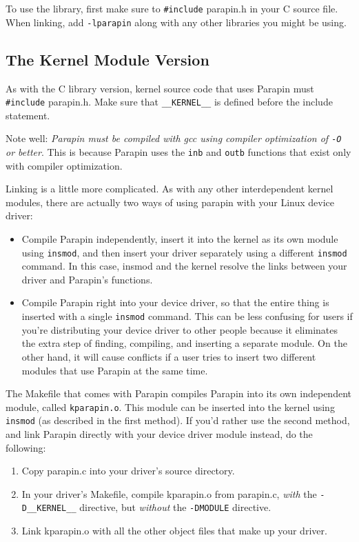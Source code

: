 \documentclass{article}
\begin{document}
To use the library, first make sure to {\tt \#include} parapin.h in
your C source file.  When linking, add {\tt -lparapin} along with any
other libraries you might be using.


\subsection{The Kernel Module Version}

As with the C library version, kernel source code that uses Parapin
must {\tt \#include} parapin.h.  Make sure that \verb|__KERNEL__| is
defined before the include statement.

Note well: {\em Parapin must be compiled with gcc using compiler
optimization of {\tt -O} or better}.  This is because Parapin uses the
{\tt inb} and {\tt outb} functions that exist only with compiler
optimization.

Linking is a little more complicated.  As with any other
interdependent kernel modules, there are actually two ways of using
parapin with your Linux device driver:
\begin{itemize}
\item Compile Parapin independently, insert it into the kernel as its
own module using {\tt insmod}, and then insert your driver separately
using a different {\tt insmod} command.  In this case, insmod and the
kernel resolve the links between your driver and Parapin's functions.
\item Compile Parapin right into your device driver, so that the
entire thing is inserted with a single {\tt insmod} command.  This can
be less confusing for users if you're distributing your device driver
to other people because it eliminates the extra step of finding,
compiling, and inserting a separate module.  On the other hand, it
will cause conflicts if a user tries to insert two different modules
that use Parapin at the same time.
\end{itemize}

The Makefile that comes with Parapin compiles Parapin into its own
independent module, called {\tt kparapin.o}.  This module can be
inserted into the kernel using {\tt insmod} (as described in the first
method).  If you'd rather use the second method, and link Parapin
directly with your device driver module instead, do the following:

\begin{enumerate}
\item Copy parapin.c into your driver's source directory.
\item In your driver's Makefile, compile kparapin.o from parapin.c,
{\em with} the \verb|-D__KERNEL__| directive, but {\em without} the
{\tt -DMODULE} directive.
\item Link kparapin.o with all the other object files that make up
your driver.
\end{enumerate}
\end{document}
